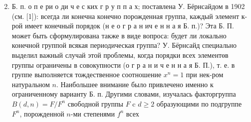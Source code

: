 \documentclass[10pt]{article}
\begin{document}
\begin{enumerate}

  \setcounter{enumi}{1}

  \item Б. п. о п е ри о ди ч е с ких г р у п п а х; поставлена У. Бёрнсайдом в 1902 (см. [1]): всегда ли конечна конечно порожденная группа, каждый элемент к-рой имеет конечный порядок (н е о г р а н ич е н н а я Б. п.)? Эта Б. П. может быть сформулирована также в виде вопроса: будет ли локально конечной группой всякая периодическая группа? У. Бёрнсайд специально выделил важный случай этой проблемы, когда порядки всех элементөв группы ограничены в совокупности (о г р а н и ч е н н а я Б. П.), т. е. в группе выполняется тождественное соотношение $x^{n}=1$ при нек-ром натуральном $n$. Наибольшее внимание было привлечено именно к ограниченному варианту Б. п. Другими словами, изучалась факторгруппа $B(d, n)=F / F^{n}$ свободной группы $F$ c $d \geqslant 2$ образующими по подгруппе $F^{n}$, порожденной $n$-ми степенями $f^{n}$ всех

\end{enumerate}
\end{document}
